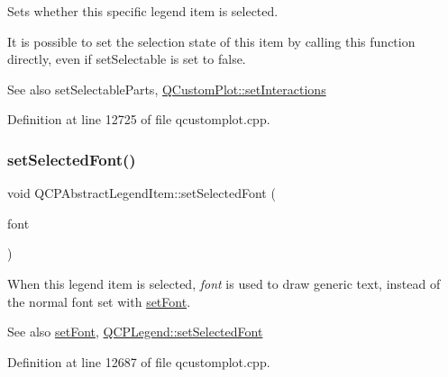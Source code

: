 Sets whether this specific legend item is selected.

It is possible to set the selection state of this item by calling this function directly, even if set\+Selectable is set to false.

\begin{DoxySeeAlso}{See also}
set\+Selectable\+Parts, \hyperlink{class_q_custom_plot_a5ee1e2f6ae27419deca53e75907c27e5}{Q\+Custom\+Plot\+::set\+Interactions} 
\end{DoxySeeAlso}


Definition at line 12725 of file qcustomplot.\+cpp.

\mbox{\label{class_q_c_p_abstract_legend_item_a91db5aee48617a9d3206e61376807365}} 
\subsubsection{\texorpdfstring{set\+Selected\+Font()}{setSelectedFont()}}
{\footnotesize\ttfamily void Q\+C\+P\+Abstract\+Legend\+Item\+::set\+Selected\+Font (\begin{DoxyParamCaption}\item[{const Q\+Font \&}]{font }\end{DoxyParamCaption})}

When this legend item is selected, {\itshape font} is used to draw generic text, instead of the normal font set with \hyperlink{class_q_c_p_abstract_legend_item_a409c53455d8112f71d70c0c43eb10265}{set\+Font}.

\begin{DoxySeeAlso}{See also}
\hyperlink{class_q_c_p_abstract_legend_item_a409c53455d8112f71d70c0c43eb10265}{set\+Font}, \hyperlink{class_q_c_p_legend_ab580a01c3c0a239374ed66c29edf5ad2}{Q\+C\+P\+Legend\+::set\+Selected\+Font} 
\end{DoxySeeAlso}


Definition at line 12687 of file qcustomplot.\+cpp.

\mbox{\label{class_q_c_p_abstract_legend_item_a4d01d008ee1a5bfe9905b0397a421936}} 
